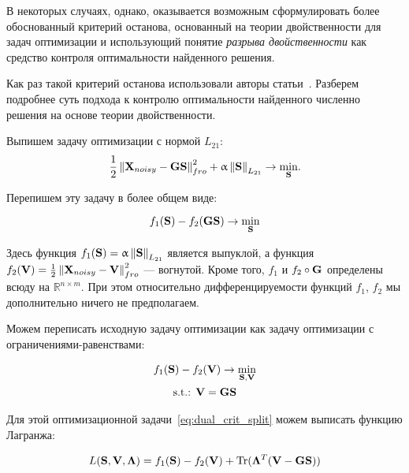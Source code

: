 В некоторых случаях, однако, оказывается возможным сформулировать более
обоснованный критерий останова, основанный на теории двойственности для
задач оптимизации и использующий понятие \emph{разрыва двойственности}
как средство контроля оптимальности найденного решения.

Как раз такой критерий останова использовали авторы статьи~\cite{gramfort_2012}.
Разберем подробнее суть подхода к контролю оптимальности найденного численно
решения на основе теории двойственности.

Выпишем задачу оптимизации с нормой $L_{21}$:
\begin{equation}
    \frac{1}{2}\left\lVert\mathbf{X}_{noisy} - \mathbf{G}\mathbf{S}\right\rVert^2_{fro} + \upalpha \left\lVert\mathbf{S}\right\rVert_{L_{21}}
    \rightarrow \underset{\mathbf{S}}{\min}.
    \label{eq:l21_reg_func_crit}
\end{equation}

Перепишем эту задачу в более общем виде:

\begin{equation}
    f_1(\mathbf{S}) - f_2(\mathbf{G}\mathbf{S}) \rightarrow \min_{\mathbf{S}}
    \label{eq:dual_init_crit}
\end{equation}

Здесь функция $f_1(\mathbf{S})=\upalpha \left\lVert\mathbf{S}\right\rVert_{L_{21}}$ является
выпуклой, а функция $f_2(\mathbf{V})=\frac{1}{2}\left\lVert\mathbf{X}_{noisy} - \mathbf{V}\right\rVert^2_{fro}$ --- вогнутой.
Кроме того, $f_1$ и $f_2\circ\mathbf{G}$ определены всюду на $\mathbb{R}^{n\times m}$.
При этом относительно дифференцируемости функций $f_1$, $f_2$ мы дополнительно
ничего не предполагаем.

Можем переписать исходную задачу оптимизации как задачу оптимизации с
ограничениями-равенствами:

\begin{equation}
    \begin{gathered}
        f_1(\mathbf{S}) - f_2(\mathbf{V}) \rightarrow \min_{\mathbf{S},\mathbf{V}}\\
        \text{s.t.: } \mathbf{V} = \mathbf{G}\mathbf{S}
    \end{gathered}
    \label{eq:dual_crit_split}
\end{equation}


Для этой оптимизационной задачи~\ref{eq:dual_crit_split} можем выписать функцию Лагранжа:

\begin{equation}
    L(\mathbf{S}, \mathbf{V}, \mathbf{\Lambda}) = f_1(\mathbf{S}) - f_2(\mathbf{V}) + \operatorname*{Tr}(\mathbf{\Lambda}^T(\mathbf{V} - \mathbf{G}\mathbf{S}))
    \label{eq:dual_lagrangian}
\end{equation}

